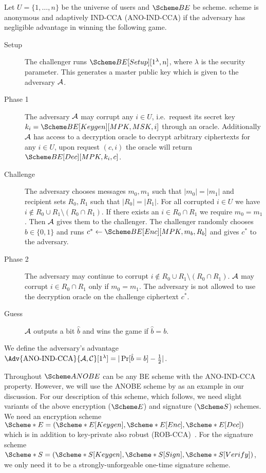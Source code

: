 \begin{definition}\label{ANO-IND-CCA}
  Let \(U = \{1, \ldots, n\}\) be the universe of users and \(\BE\) be  
  scheme.
   scheme is anonymous and adaptively IND-CCA (ANO-IND-CCA) if the 
  adversary has negligible advantage in winning the following game.
  \begin{description}
    \item[Setup] The challenger runs \(\BE[Setup][1^\lambda, n]\), where 
      \(\lambda\) is the security parameter.
      This generates a master public key which is given to the adversary 
      \(\A\).

    \item[Phase 1] The adversary \(\A\) may corrupt any \(i\in U\), i.e.\ 
      request its secret key \(k_i = \BE[Keygen][MPK, MSK, i]\) through an 
      oracle.
      Additionally \(\A\) has access to a decryption oracle to decrypt 
      arbitrary ciphertexts for any \(i\in U\), upon request \((c, i)\) the 
      oracle will return \(\BE[Dec][MPK, k_i, c]\).

    \item[Challenge] The adversary chooses messages \(m_0, m_1\) such that 
      \(|m_0| = |m_1|\) and recipient sets \(R_0, R_1\) such that \(|R_0| 
        = |R_1|\).
      For all corrupted \(i\in U\) we have \(i\notin R_0\cup R_1\setminus 
        (R_0\cap R_1)\).
      If there exists an \(i\in R_0\cap R_1\) we require \(m_0 = m_1\).
      Then \(\A\) gives them to the challenger.
      The challenger randomly chooses \(b\in \{0, 1\}\) and runs \(c^*\gets 
        \BE[Enc][MPK, m_b, R_b]\) and gives \(c^*\) to the adversary.

    \item[Phase 2] The adversary may continue to corrupt \(i\notin R_0\cup 
        R_1\setminus (R_0\cap R_1)\).
      \(\A\) may corrupt \(i\in R_0\cap R_1\) only if \(m_0 = m_1\).
      The adversary is not allowed to use the decryption oracle on the 
      challenge ciphertext \(c^*\).

    \item[Guess] \(\A\) outputs a bit \(\hat{b}\) and wins the game if 
      \(\hat{b} = b\).

  \end{description}
  We define the adversary's advantage \(\Adv{\text{ANO-IND-CCA}}{\A, 
      \Cop}[1^\lambda] = |\Pr[ \hat{b} = b ] - \frac{1}{2}|\).
\end{definition}

Throughout \(\ANOBE\) can be any \ac{BE} scheme with the ANO-IND-CCA property.
However, we will use the \ac{ANOBE} scheme by \citet{ANOBE} as an example in 
our discussion.
For our description of this scheme, which follows, we need slight variants of 
the above encryption (\(\E\)) and signature (\(\S\)) schemes.
We need an encryption scheme \(\E* = (\E*[Keygen], \E*[Enc], \E*[Dec])\) which 
is in addition to key-private also robust (ROB-CCA)~\cite{RobustEncryption}.
For the signature scheme \(\S* = (\S*[Keygen], \S*[Sign], \S*[Verify])\), we 
only need it to be a strongly-unforgeable one-time signature scheme.
